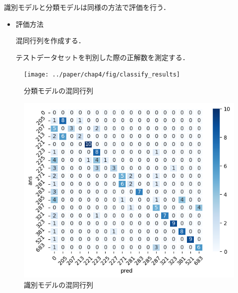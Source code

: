 識別モデルと分類モデルは同様の方法で評価を行う．
\begin{itemize}
	\item 評価方法
	
	混同行列を作成する．
	
	テストデータセットを判別した際の正解数を測定する．
	
	

\end{itemize}
\newpage
\begin{figure}[htbp]
	\begin{minipage}[b]{0.5\linewidth}
		\centering
		\texttt{[image: ../paper/chap4/fig/classify\_results]}
		\caption{分類モデルの混同行列}
	\end{minipage}
  \begin{minipage}[b]{0.5\linewidth}
 	\centering
  	\includegraphics[width=\linewidth]{../paper/chap4/fig/predicted_results}
  	\caption{識別モデルの混同行列}
  	\label{det_confusion}
  \end{minipage}
\end{figure}



